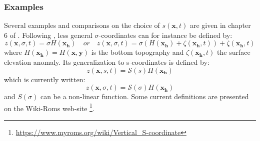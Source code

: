 \subsubsection{Examples}
Several examples and comparisons on the choice of $s(\mathbf{x},t)$ are given in chapter 6 of \citet{griffies_fundamentals_2004}.
Following  \citep{shchepetkin_regional_2005},  less general $\sigma$-coordinates can for instance be defined by:
\begin{equation}
 \displaystyle
 z(\mathbf{x},\sigma,t)=\sigma H(\mathbf{x_h})\quad or\quad z(\mathbf{x},\sigma,t)=\sigma(H(\mathbf{x_h})+\zeta(\mathbf{x_h},t))+\zeta(\mathbf{x_h},t)
\end{equation}
where $H(\mathbf{x_h})=H(\mathbf{x,y})$ is the bottom topography and $\zeta(\mathbf{x_h},t)$ the surface elevation anomaly. Its generalization to s-coordinates is defined by:
\begin{equation}
 \displaystyle
 z(\mathbf{x},s,t)=\mathcal{S}(s) H(\mathbf{x_h})
\end{equation}
which is currently written:
\begin{equation}
 \displaystyle
 z(\mathbf{x},\sigma,t)=\mathcal{S}(\sigma) H(\mathbf{x_h})
\end{equation}
and $S(\sigma)$ can be a non-linear function. Some current definitions are presented on the Wiki-Roms web-site \footnote{\url{https://www.myroms.org/wiki/Vertical_S-coordinate}}.\\


